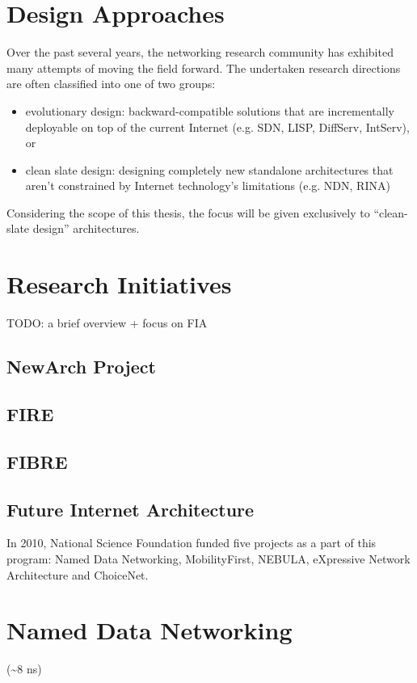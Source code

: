     \section{Design Approaches}

        Over the past several years, the networking research community has exhibited many attempts of moving the field forward. The undertaken research directions are often classified into one of two groups:

        \begin{itemize}
            \item evolutionary design: backward-compatible solutions that are incrementally deployable on top of the current Internet (e.g. SDN, LISP, DiffServ, IntServ), or
            \item clean slate design: designing completely new standalone architectures that aren't constrained by Internet technology's limitations (e.g. NDN, RINA)
        \end{itemize}

        Considering the scope of this thesis, the focus will be given exclusively to ``clean-slate design'' architectures.

    \section{Research Initiatives}

        TODO: a brief overview + focus on FIA

        \subsection{NewArch Project}
        \subsection{FIRE}
        \subsection{FIBRE}
        \subsection{Future Internet Architecture}
            In 2010, National Science Foundation funded five projects as a part of this program: Named Data Networking, MobilityFirst, NEBULA, eXpressive Network Architecture and ChoiceNet.


    \section{Named Data Networking}
        (\textasciitilde8 ns)
